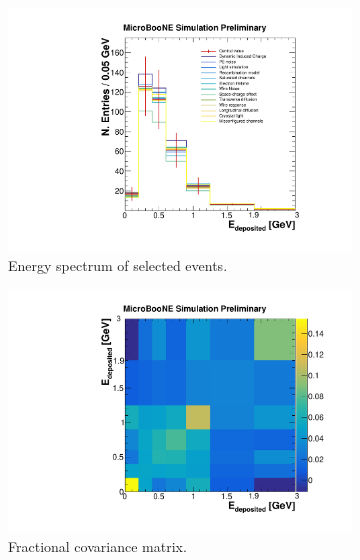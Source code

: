 \begin{figure}[htbp]
  \begin{center}
    \begin{subfigure}{0.48\textwidth}
      \includegraphics[width=\linewidth]{figures/reco_det.pdf}
      \caption{Energy spectrum of selected events.}  \label{fig:reco_det}
    \end{subfigure}\hfill
    \begin{subfigure}{0.48\textwidth}
      \includegraphics[width=\linewidth]{figures/frac_det.pdf}
      \caption{Fractional covariance matrix.}  \label{fig:frac_det}
    \end{subfigure}
    \begin{subfigure}{0.48\textwidth}

\end{subfigure}
\end{center}
\end{figure}
